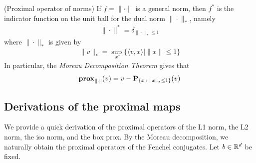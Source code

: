 \documentclass{article}
\theoremstyle{definition}
\theoremstyle{remark}
\begin{document}
\begin{proposition}(Proximal operator of norms) \label{normprox}
  If $f = \| \cdot \|$ is a general norm, then $f^*$ is the indicator function on the unit ball for the dual norm $\| \cdot \|_*$, namely 
   \begin{equation*}
    \begin{split}
      \|\cdot \| ^* = \delta_{\|\cdot \|_* \leq 1}
    \end{split}
  \end{equation*}
  where $\|\cdot \|_*$ is given by 
\begin{equation*}
  \begin{split}
    \| v\|_* = \sup_x \{\langle v, x\rangle \mid \|x\|\leq 1\} 
  \end{split}
\end{equation*}
In particular, the \textit{Moreau Decomposition Theorem} gives that 
\begin{equation*}
  \begin{split}
    \operatorname{\mathbf{prox}}_{\|\cdot \|}(v) = v - \operatorname{\mathbf{P}}_{\{x \;: \; \|x \|_* \leq 1\}} (v) 
  \end{split}
\end{equation*}
\end{proposition}

\subsection{Derivations of the proximal maps}
We provide a quick derivation of the proximal operators of the L1 norm, the L2 norm, the iso norm, and the box prox. By the Moreau decomposition, we naturally obtain the proximal operators of the Fenchel conjugates. Let $b \in \mathbb{R}^d$ be fixed.

\medskip
\end{document}
